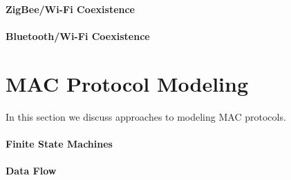 \paragraph{ZigBee/Wi-Fi Coexistence}


\paragraph{Bluetooth/Wi-Fi Coexistence}

\section{MAC Protocol Modeling}

In this section we discuss approaches to modeling MAC protocols.

\paragraph{Finite State Machines}

\paragraph{Data Flow}


